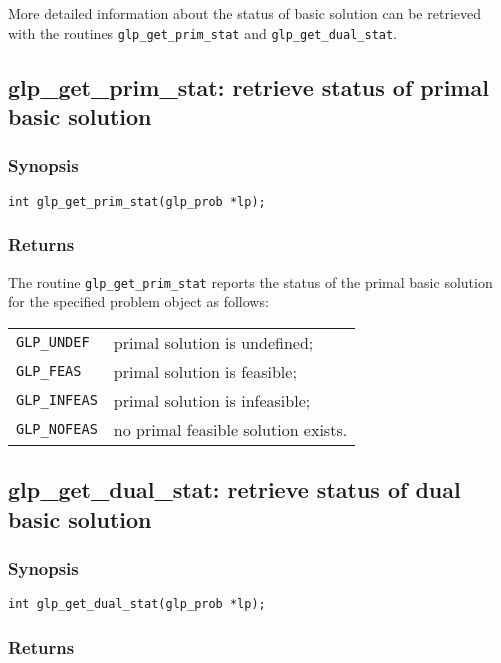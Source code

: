 More detailed information about the status of basic solution can be
retrieved with the routines \verb|glp_get_prim_stat| and
\verb|glp_get_dual_stat|.

\newpage

\subsection{glp\_get\_prim\_stat: retrieve status of primal basic
solution}

\subsubsection*{Synopsis}

\begin{verbatim}
int glp_get_prim_stat(glp_prob *lp);
\end{verbatim}

\subsubsection*{Returns}

The routine \verb|glp_get_prim_stat| reports the status of the primal
basic solution for the specified problem object as follows:

\begin{tabular}{@{}ll}
\verb|GLP_UNDEF|  & primal solution is undefined; \\
\verb|GLP_FEAS|   & primal solution is feasible; \\
\verb|GLP_INFEAS| & primal solution is infeasible; \\
\verb|GLP_NOFEAS| & no primal feasible solution exists. \\
\end{tabular}

\subsection{glp\_get\_dual\_stat: retrieve status of dual basic
solution}

\subsubsection*{Synopsis}

\begin{verbatim}
int glp_get_dual_stat(glp_prob *lp);
\end{verbatim}

\subsubsection*{Returns}


